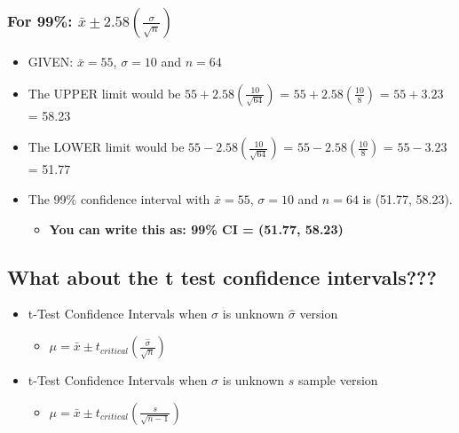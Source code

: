 \documentclass[]{article}
\begin{document}
\subsubsection{For 99\%:
$\bar{x} \pm 2.58(\frac{\sigma}{\sqrt{n}})$}\label{for-99-barx-pm-2.58fracsigmasqrtn}

\begin{itemize}
\itemsep1pt\parskip0pt
\item
  GIVEN: $\bar{x}=55$, $\sigma = 10$ and $n=64$
\item
  The UPPER limit would be $55 + 2.58(\frac{10}{\sqrt{64}})$ =
  $55 + 2.58(\frac{10}{8})$ = $55 + 3.23$ = 58.23
\item
  The LOWER limit would be $55 - 2.58(\frac{10}{\sqrt{64}})$ =
  $55 - 2.58(\frac{10}{8})$ = $55 - 3.23$ = 51.77
\item
  The 99\% confidence interval with $\bar{x}=55$, $\sigma = 10$ and
  $n=64$ is (51.77, 58.23).

  \begin{itemize}
  \itemsep1pt\parskip0pt
  \item
    \textbf{You can write this as: 99\% CI = (51.77, 58.23)}
  \end{itemize}
\end{itemize}

\subsection{What about the t test confidence
intervals???}\label{what-about-the-t-test-confidence-intervals}

\begin{itemize}
\itemsep1pt\parskip0pt
\item
  t-Test Confidence Intervals when $\sigma$ is unknown $\hat{\sigma}$
  version

  \begin{itemize}
  \itemsep1pt\parskip0pt
  \item
    $\mu = \bar{x} \pm t_{critical}(\frac{\hat{\sigma}}{\sqrt{n}})$
  \end{itemize}
\item
  t-Test Confidence Intervals when $\sigma$ is unknown $s$ sample
  version

  \begin{itemize}
  \itemsep1pt\parskip0pt
  \item
    $\mu = \bar{x} \pm t_{critical}(\frac{s}{\sqrt{n-1}})$
  \end{itemize}
\end{itemize}
\end{document}
